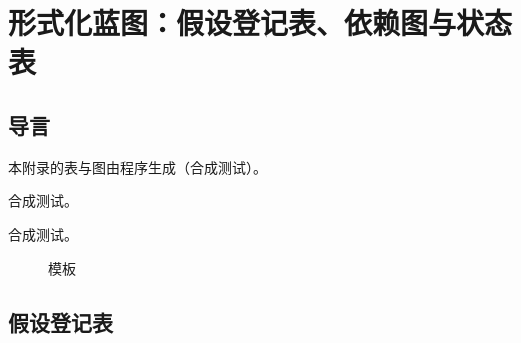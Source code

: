 \chapter{形式化蓝图：假设登记表、依赖图与状态表}\label{app:appP}

\section{导言}\label{sec:appP-intro}

本附录的表与图由程序生成（合成测试）。

\begin{definition}[内容等级]\label{def:appP-content-grade}
合成测试。
\end{definition}

\begin{remark}\label{rem:appP-limits}
合成测试。
\end{remark}

\begin{figure}[htbp]\centering{}\caption{模板}\label{fig:appP-dependency}\end{figure}

\section{假设登记表}\label{sec:appP-register}
